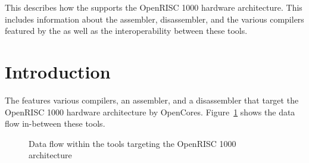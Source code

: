 




\renewcommand{\seeorok}{}

{This \documentation{} describes how the \ecs{} supports the OpenRISC 1000 hardware architecture.
This includes information about the assembler, disassembler, and the various compilers featured by the \ecs{} as well as the interoperability between these tools.}

\section{Introduction}

The \ecs{} features various compilers, an assembler, and a disassembler that target the OpenRISC 1000 hardware architecture by OpenCores.
Figure~\ref{fig:or1kdataflow} shows the data flow in-between these tools.

\begin{figure}
\caption{Data flow within the tools targeting the OpenRISC 1000 architecture}
\label{fig:or1kdataflow}
\end{figure}

